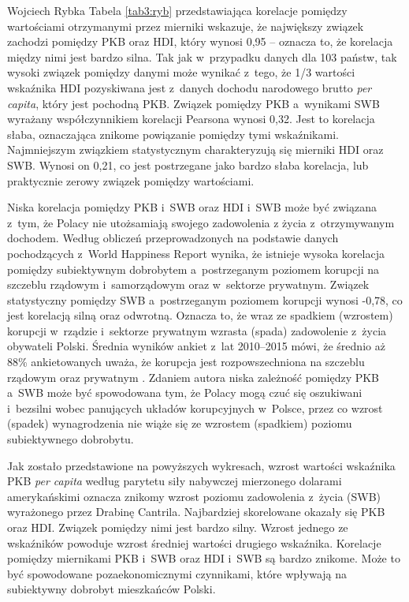 \begin{artplenv}{Wojciech Rybka}
Tabela \ref{tab3:ryb} przedstawiająca korelacje pomiędzy wartościami otrzymanymi przez mierniki wskazuje, że największy związek
zachodzi pomiędzy PKB oraz HDI, który wynosi 0,95 -- oznacza to, że korelacja między nimi jest bardzo silna. Tak
jak w~przypadku danych dla 103 państw, tak wysoki związek pomiędzy danymi może wynikać z~tego, że 1/3 wartości wskaźnika HDI
pozyskiwana jest z~danych dochodu narodowego brutto \textit{per capita}, który jest pochodną PKB. Związek pomiędzy
PKB a~wynikami SWB wyrażany współczynnikiem korelacji Pearsona wynosi 0,32. Jest to korelacja słaba, oznaczająca znikome
powiązanie pomiędzy tymi wskaźnikami. Najmniejszym związkiem statystycznym charakteryzują się mierniki HDI oraz SWB.
Wynosi on 0,21, co jest postrzegane jako bardzo słaba korelacja, lub praktycznie zerowy związek pomiędzy wartościami. 

Niska korelacja pomiędzy PKB i~SWB oraz HDI i~SWB może być związana z~tym, że Polacy nie utożsamiają swojego zadowolenia
z życia z~otrzymywanym dochodem. Według obliczeń przeprowadzonych na podstawie danych pochodzących z~World
Happiness Report wynika, że istnieje wysoka korelacja pomiędzy subiektywnym dobrobytem a~postrzeganym poziomem korupcji
na szczeblu rządowym i~samorządowym oraz w~sektorze prywatnym. Związek statystyczny pomiędzy SWB a~postrzeganym
poziomem korupcji wynosi -0,78, co jest korelacją silną oraz odwrotną. Oznacza to, że wraz ze spadkiem (wzrostem)
korupcji w~rządzie i~sektorze prywatnym wzrasta (spada) zadowolenie z~życia obywateli Polski. Średnia wyników
ankiet z~lat 2010--2015 mówi, że średnio aż 88\% ankietowanych uważa, że korupcja jest rozpowszechniona na szczeblu rządowym oraz
prywatnym
\parencite{noauthor_world_2018}.
Zdaniem autora niska zależność pomiędzy PKB a~SWB
może być spowodowana tym, że Polacy mogą czuć się oszukiwani i~bezsilni wobec panujących układów korupcyjnych w~Polsce,
przez co wzrost (spadek) wynagrodzenia nie wiąże się ze wzrostem (spadkiem) poziomu subiektywnego dobrobytu.


Jak zostało przedstawione na
powyższych wykresach, wzrost wartości wskaźnika PKB \textit{per capita} według parytetu siły nabywczej mierzonego dolarami
amerykańskimi oznacza znikomy wzrost poziomu zadowolenia z~życia (SWB) wyrażonego przez Drabinę Cantrila. Najbardziej
skorelowane okazały się PKB oraz HDI. Związek pomiędzy nimi jest bardzo silny.
Wzrost jednego ze wskaźników powoduje wzrost średniej wartości drugiego wskaźnika. Korelacje pomiędzy miernikami
PKB i~SWB oraz HDI i~SWB są bardzo znikome. Może to być spowodowane pozaekonomicznymi czynnikami, które wpływają na
subiektywny dobrobyt mieszkańców Polski.


\end{artplenv}
